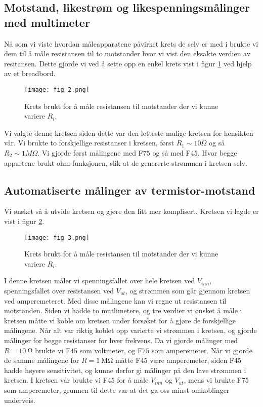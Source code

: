 \documentclass[%
 reprint,
nofootinbib,
aps,
]{revtex4-1}
\begin{document}
\subsection{Motstand, likestrøm og likespenningsmålinger med multimeter}
Nå som vi viste hvordan måleapparatene påvirket krets de selv er med i brukte vi dem til å måle resistansen til to motstander hvor vi vist den eksakte verdien av resitansen. Dette gjorde vi ved å sette opp en enkel krets vist i figur \ref{fig2} ved hjelp av et breadbord.
\begin{figure}[h!]
    \centering
    \texttt{[image: fig\_2.png]}
    \caption{Krets brukt for å måle resistansen til motstander der vi kunne variere $R_i$.}
    \label{fig2}
\end{figure}
Vi valgte denne kretsen siden dette var den letteste mulige kretsen for hensikten vår. Vi brukte to forskjellige resistanser i kretsen, først $R_1 \sim 10 \Omega$ og så $R_2 \sim 1 M\Omega$. Vi gjorde først målingene med F$75$ og så med F$45$. Hvor begge appartene brukt ohm-funksjonen, slik at de genererte strømmen i kretsen selv.

\subsection{Automatiserte målinger av termistor-motstand}
Vi ønsket så å utvide kretsen og gjøre den litt mer komplisert. Kretsen vi lagde er vist i figur \ref{fig3}.
\begin{figure}[h!]
    \centering
    \texttt{[image: fig\_3.png]}
    \caption{Krets brukt for å måle resistansen til motstander der vi kunne variere $R_i$.}
    \label{fig3}
\end{figure}
I denne kretsen måler vi spenningsfallet over hele kretsen ved $V_{inn}$, spenningsfallet over resistansen ved $V_{ut}$, og strømmen som går gjennom kretsen ved amperemeteret. Med disse målingene kan vi regne ut resistansen til motstanden. Siden vi hadde to mutlimetere, og tre verdier vi ønsket å måle i kretsen måtte vi koble om kretsen under forsøket for å gjøre de forskjellige målingene. Når alt var riktig koblet opp varierte vi strømmen i kretsen, og gjorde målinger for begge resistanser for hver frekvens. Da vi gjorde målinger med $R=\SI{10}{\ohm}$ brukte vi F$45$ som voltmeter, og F$75$ som amperemeter. Når vi gjorde de samme målingene for $R=\SI{1}{\mega \ohm}$ måtte F$45$ være amperemeter, siden F$45$ hadde høyere sensitivitet, og kunne derfor gi målinger på den lave strømmen i kretsen. I kretsen vår brukte vi F$45$ for å måle $V_{inn}$ og $V_{ut}$, mens vi brukte F$75$ som amperemeter, grunnen til dette var at det ga oss minst omkoblinger underveis.
\end{document}
